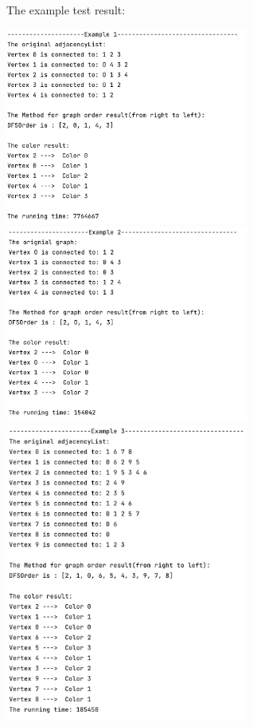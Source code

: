 \documentclass{article}
\begin{document}
\begin{enumerate}
\begin{verbatim}
    \end{verbatim}
    The example test result:
            \begin{center}
        \includegraphics[width=0.6\textwidth]{p9.png}
        \includegraphics[width=0.6\textwidth]{p10.png}
        \includegraphics[width=0.6\textwidth]{p11.png}
    \end{center}
    

\end{enumerate}
\end{document}
